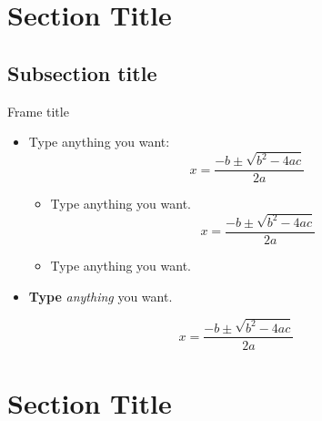 \documentclass[8pt, compress]{beamer}
\begin{document}
\section{Section Title}

\subsection{Subsection title}

\begin{frame}{Frame title}
\begin{itemize} \setlength\itemsep{0.5em}
  \item Type anything you want:
  \[
    x = \frac{-b \pm \sqrt{b^2-4ac}}{2a}
  \]
  \begin{itemize}
      \item Type anything you want.
      \[
        x = \frac{-b \pm \sqrt{b^2-4ac}}{2a}
      \]
  \end{itemize}
  \begin{itemize}
      \item Type anything you want.
  \end{itemize}
  \item \textbf{Type} \textit{anything} you want.
\end{itemize}
\[
    x = \frac{-b \pm \sqrt{b^2-4ac}}{2a}
\]
\end{frame}


\section{Section Title}
\end{document}
